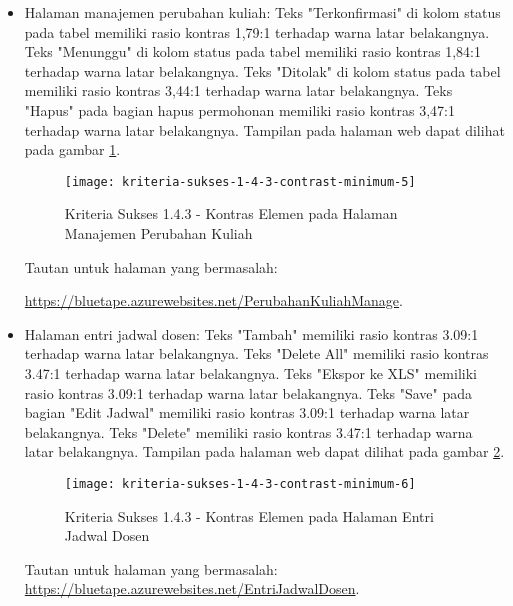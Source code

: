 \begin{itemize}
    \item Halaman manajemen perubahan kuliah: Teks "Terkonfirmasi" di kolom status pada tabel memiliki rasio kontras 1,79:1 terhadap warna latar belakangnya. Teks "Menunggu" di kolom status pada tabel memiliki rasio kontras 1,84:1 terhadap warna latar belakangnya. Teks "Ditolak" di kolom status pada tabel memiliki rasio kontras 3,44:1 terhadap warna latar belakangnya. Teks "Hapus" pada bagian hapus permohonan memiliki rasio kontras 3,47:1 terhadap warna latar belakangnya. Tampilan pada halaman web dapat dilihat pada gambar \ref{fig:1.4.3_contrast_minimum_5}.
    \begin{figure}[H]
        \centering  
        \texttt{[image: kriteria-sukses-1-4-3-contrast-minimum-5]}  
        \caption[Kriteria Sukses 1.4.3 - Kontras Elemen pada Halaman Manajemen Perubahan Kuliah]{Kriteria Sukses 1.4.3 - Kontras Elemen pada Halaman Manajemen Perubahan Kuliah}
        \label{fig:1.4.3_contrast_minimum_5}  
    \end{figure} 
    Tautan untuk halaman yang bermasalah: 
    
    \url{https://bluetape.azurewebsites.net/PerubahanKuliahManage}.

    \item Halaman entri jadwal dosen: Teks "Tambah" memiliki rasio kontras 3.09:1 terhadap warna latar belakangnya. Teks "Delete All" memiliki rasio kontras 3.47:1 terhadap warna latar belakangnya. Teks "Ekspor ke XLS" memiliki rasio kontras 3.09:1 terhadap warna latar belakangnya. Teks "Save" pada bagian "Edit Jadwal" memiliki rasio kontras 3.09:1 terhadap warna latar belakangnya. Teks "Delete" memiliki rasio kontras 3.47:1 terhadap warna latar belakangnya. Tampilan pada halaman web dapat dilihat pada gambar \ref{fig:1.4.3_contrast_minimum_6}.
    \begin{figure}[H]
        \centering  
        \texttt{[image: kriteria-sukses-1-4-3-contrast-minimum-6]}  
        \caption[Kriteria Sukses 1.4.3 - Kontras Elemen pada Halaman Entri Jadwal Dosen]{Kriteria Sukses 1.4.3 - Kontras Elemen pada Halaman Entri Jadwal Dosen}
        \label{fig:1.4.3_contrast_minimum_6}  
    \end{figure} 
    Tautan untuk halaman yang bermasalah: \url{https://bluetape.azurewebsites.net/EntriJadwalDosen}.
    

\end{itemize}
